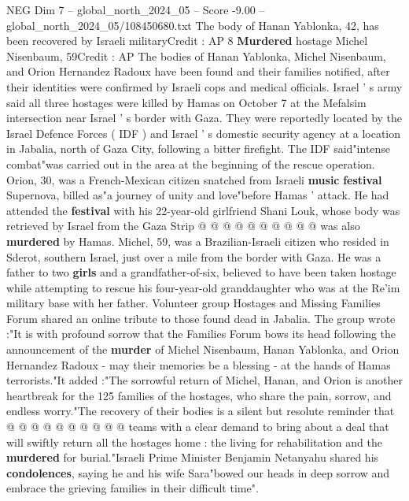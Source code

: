 \begin{textsample}{NEG Dim 7 – global\_north\_2024\_05 – Score -9.00 – global\_north\_2024\_05/108450680.txt}  \label{ex:f7_neg_184}
The body of Hanan Yablonka, 42, has been recovered by Israeli militaryCredit : AP 8 \textbf{Murdered} hostage Michel Nisenbaum, 59Credit : AP The bodies of Hanan Yablonka, Michel Nisenbaum, and Orion Hernandez Radoux have been found and their families notified, after their identities were confirmed by Israeli cops and medical officials.
Israel ' s army said all three hostages were killed by Hamas on October 7 at the Mefalsim intersection near Israel ' s border with Gaza.
They were reportedly located by the Israel Defence Forces ( IDF ) and Israel ' s domestic security agency at a location in Jabalia, north of Gaza City, following a bitter firefight.
The IDF said"intense combat"was carried out in the area at the beginning of the rescue operation.
Orion, 30, was a French-Mexican citizen snatched from Israeli \textbf{music} \textbf{festival} Supernova, billed as"a journey of unity and love"before Hamas ' attack.
He had attended the \textbf{festival} with his 22-year-old girlfriend Shani Louk, whose body was retrieved by Israel from the Gaza Strip @ @ @ @ @ @ @ @ @ @ was also \textbf{murdered} by Hamas.
Michel, 59, was a Brazilian-Israeli citizen who resided in Sderot, southern Israel, just over a mile from the border with Gaza.
He was a father to two \textbf{girls} and a grandfather-of-six, believed to have been taken hostage while attempting to rescue his four-year-old granddaughter who was at the Re'im military base with her father.
Volunteer group Hostages and Missing Families Forum shared an online tribute to those found dead in Jabalia.
The group wrote :"It is with profound sorrow that the Families Forum bows its head following the announcement of the \textbf{murder} of Michel Nisenbaum, Hanan Yablonka, and Orion Hernandez Radoux - may their memories be a blessing - at the hands of Hamas terrorists."It added :"The sorrowful return of Michel, Hanan, and Orion is another heartbreak for the 125 families of the hostages, who share the pain, sorrow, and endless worry."The recovery of their bodies is a silent but resolute reminder that @ @ @ @ @ @ @ @ @ @ teams with a clear demand to bring about a deal that will swiftly return all the hostages home : the living for rehabilitation and the \textbf{murdered} for burial."Israeli Prime Minister Benjamin Netanyahu shared his \textbf{condolences}, saying he and his wife Sara"bowed our heads in deep sorrow and embrace the grieving families in their difficult time".

\end{textsample}
